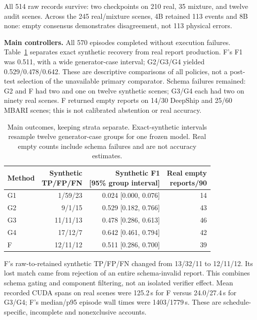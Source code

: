 \documentclass[runningheads,orivec]{llncs}
\begin{document}
All 514 raw records survive: two checkpoints on 210 real, 35 mixture, and twelve audit scenes. Across the 245 real/mixture scenes, 4B retained 113 events and 8B none: empty consensus demonstrates disagreement, not 113 physical errors.

\textbf{Main controllers.} All 570 episodes completed without execution failures. Table~\ref{tab:main} separates exact synthetic recovery from real report production. F's F1 was 0.511, with a wide generator-case interval; G2/G3/G4 yielded 0.529/0.478/0.642. These are descriptive comparisons of all policies, not a post-test selection of the unavailable primary comparator. Schema failures remained: G2 and F had two and one on twelve synthetic scenes; G3/G4 each had two on ninety real scenes. F returned empty reports on 14/30 DeepShip and 25/60 MBARI scenes; this is not calibrated abstention or real accuracy.

\begin{table}[tb]
\caption{Main outcomes, keeping strata separate. Exact-synthetic intervals resample twelve generator-case groups for one frozen model. Real empty counts include schema failures and are not accuracy estimates.}
\label{tab:main}\centering\small
\begin{tabular}{@{}lrrr@{}}\toprule
Method & \shortstack{Synthetic\\TP/FP/FN} & \shortstack{Synthetic F1\\{[95\% group interval]}} & \shortstack{Real empty\\reports/90} \\\midrule
G1 & 1/59/23 & 0.024 [0.000, 0.076] & 14 \\
G2 & 9/1/15 & 0.529 [0.182, 0.766] & 43 \\
G3 & 11/11/13 & 0.478 [0.286, 0.613] & 46 \\
G4 & 17/12/7 & 0.642 [0.461, 0.794] & 42 \\
F & 12/11/12 & 0.511 [0.286, 0.700] & 39 \\\bottomrule
\end{tabular}
\end{table}

F's raw-to-retained synthetic TP/FP/FN changed from 13/32/11 to 12/11/12. Its lost match came from rejection of an entire schema-invalid report. This combines schema gating and component filtering, not an isolated verifier effect. Mean recorded CUDA spans on real scenes were 125.2\,s for F versus 24.0/27.4\,s for G3/G4; F's median/p95 episode wall times were 1403/1779\,s. These are schedule-specific, incomplete and nonexclusive accounts.
\end{document}

